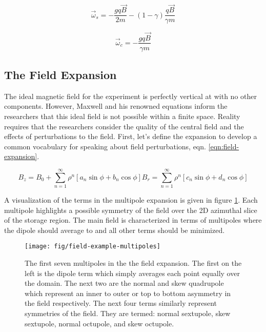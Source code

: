 \begin{equation}
\vec{\omega}_s = -\frac{gq\vec{B}}{2m} - (1 - \gamma) \frac{q\vec{B}}{\gamma m}
\label{eqn:spin-precession}
\end{equation}

\begin{equation}
\vec{\omega}_c = -\frac{gq\vec{B}}{\gamma m}
\label{eqn:cyclotron-freq}
\end{equation}

\subsection{The Field Expansion}

The ideal magnetic field for the experiment is perfectly vertical at \bmagic with no other components.  However, Maxwell and his renowned equations inform the researchers that this ideal field is not possible within a finite space.  Reality requires that the researchers consider the quality of the central field and the effects of perturbations to the field.  First, let's define the expansion to develop a common vocabulary for speaking about field perturbations, eqn. \ref{eqn:field-expansion}.

\begin{equation}
B_z = B_0 + \sum_{n=1}^{\infty} \rho^n[a_n \sin{\phi} + b_n \cos{\phi}]
B_r = \sum_{n=1}^{\infty} \rho^n[c_n \sin{\phi} + d_n \cos{\phi}]
\label{eqn:field-expansion}
\end{equation}

\noindent
A visualization of the terms in the multipole expansion is given in figure \ref{fig:field-example-multipoles}.  Each multipole highlights a possible symmetry of the field over the 2D azimuthal slice of the storage region. The main field is characterized in terms of multipoles where the dipole should average to \bmagic and all other terms should be minimized.

\begin{figure}
\label{fig:field-example-multipoles}
\texttt{[image: fig/field-example-multipoles]}
\caption{The first seven multipoles in the the field expansion.  The first on the left is the dipole term which simply averages each point equally over the domain.  The next two are the normal and skew quadrupole which represent an inner to outer or top to bottom asymmetry in the field respectively.  The next four terms similarly represent symmetries of the field.  They are termed: normal sextupole, skew sextupole, normal octupole, and skew octupole.}
\end{figure}

